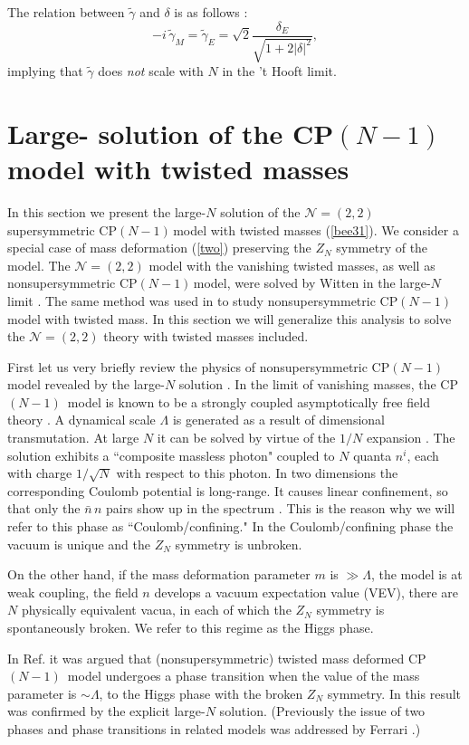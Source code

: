 \documentclass[epsfig,12pt]{article}
\def\beq{\begin{equation}}
\def\eeq{\end{equation}}
\newcommand{\cpn}{CP$(N-1)\,$}
\def\beq{\begin{equation}}
\def\eeq{\end{equation}}
\newcommand{\ntwot}{${\mathcal N}= \left(2,2\right) $ }
\begin{document}
The relation between $\tilde\gamma$ and $\delta$
is as follows \cite{BSY3}:
\beq
-i\,\tilde\gamma_M=\tilde\gamma_E = \sqrt{2} \frac{\delta_E}{\sqrt{1+ 2 |\delta |^2}},
\label{tftpi4}
\eeq
implying that $\tilde \gamma$ does {\em not} scale with $N$ in the 't Hooft limit.

\section{Large- solution
of the \cpn model with twisted masses}
\label{lnscptm}
\setcounter{equation}{0}

In this section we present the large-$N$ solution of the \ntwot supersymmetric \cpn model 
with twisted masses (\ref{bee31}). We consider a special case of mass deformation (\ref{two}) 
preserving the $Z_N$ symmetry of the model. 
The \ntwot  model with the vanishing twisted masses, as well as nonsupersymmetric \cpn model,
were solved by Witten in the large-$N$ limit \cite{W79}.
The same method was used in
\cite{GSYphtr} to study nonsupersymmetric \cpn 
model with twisted mass. In this section we will generalize this analysis 
to solve the \ntwot theory with twisted masses included. 

First let us very briefly review the physics of nonsupersymmetric \cpn model revealed
by the large-$N$ solution \cite{GSYphtr}.
In the limit of vanishing masses, the \mbox{\cpn} model is known to 
be a strongly coupled asymptotically free
field theory
\cite{BelPo}. A dynamical scale $\Lambda$ is generated as a result of
dimensional transmutation.
At large $N$ it can be solved by virtue of the $1/N$ expansion
\cite{W79}.
The solution  exhibits a ``composite massless photon"
coupled to $N$ quanta $n^i$, each with charge $1/\sqrt N$ with respect
to this photon. In two dimensions the corresponding Coulomb potential is long-range.
It causes linear confinement, so that only the $\bar n\,n$ pairs show up in the
spectrum \cite{Coleman,W79}. This is the reason why we will refer to this phase as
``Coulomb/confining." In the Coulomb/confining phase the vacuum 
is unique and the $Z_N$ symmetry is unbroken.

On the other hand, if the mass deformation parameter $m$ is $\gg\Lambda$,
the model is at weak coupling, the field $n$ develops a vacuum
expectation value (VEV),
there are $N$ physically equivalent vacua, in each of which the
$Z_N$ symmetry is spontaneously broken. We  refer to this regime
as the
Higgs phase.

In Ref. \cite{GSY05}
it was argued that (nonsupersymmetric) twisted mass deformed \mbox{\cpn} model
undergoes a phase transition when the value of the mass parameter is
$\sim \Lambda$, to the Higgs phase with the broken $Z_N$ symmetry.
 In \cite{GSYphtr} this result was confirmed by the explicit
 large-$N$ solution. (Previously
the issue of two phases and phase transitions in related models
was  addressed by Ferrari
\cite{Ferrari,Ferrari2}.)
\end{document}
